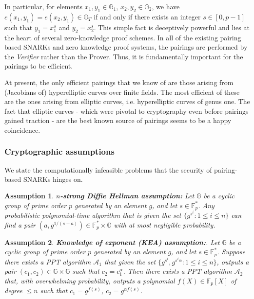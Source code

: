 \documentclass[11pt, lettersize, notitlepage, leqno, footskip=0.6cm]{article}
\newcommand{\bFp}{\mathbb{F}_p}
\newcommand{\mc}{\mathcal}
\newcommand{\mb}{\mathbb}
\newcommand{\al}{\alpha}
\newtheorem{Ass}{Assumption}[section]
\numberwithin{equation}{section}
\begin{document}
In particular, for elements $x_1,y_1\in \mb{G}_1$, $x_2,y_2\in \mb{G}_2$, we have $ e(x_1,y_1) = e(x_2,y_1)\in \mb{G}_T$ if and only if there exists an integer $s\in [0,p-1]$ such that $y_1 = x_1^s$ and $y_2 = x_2^s$. This simple fact is deceptively powerful and lies at the heart of several zero-knowledge proof schemes. In all of the existing pairing based SNARKs and zero knowledge proof systems, the pairings are performed by the \textit{Verifier} rather than the Prover. Thus, it is fundamentally important for the pairings to be efficient. 


At present, the only efficient pairings that we know of are those arising from (Jacobians of) hyperelliptic curves over finite fields. The most efficient of these are the ones arising from elliptic curves, i.e. hyperelliptic curves of genus one. The fact that elliptic curves - which were pivotal to cryptography even before pairings gained traction - are the best known source of pairings seems to be a happy coincidence.



\subsubsection{\fontsize{11}{11}\selectfont Cryptographic assumptions}



We state the computationally infeasible problems that the security of pairing-based SNARKs hinges on.

\begin{Ass} {\normalfont \textbf{{$n$-strong Diffie Hellman assumption:}}} Let $\mb{G}$ be a cyclic group of prime order $p$ generated by an element $g$, and let $s \in \bFp^*$. Any probabilistic polynomial-time algorithm that is given the set $\{g^{s^i}: 1\leq i\leq n \}$ can find a pair $(a, g^{1/(s+a)})\in \bFp^*\times \mb{G}$ with at most negligible probability.\end{Ass}

\begin{Ass} {\normalfont \textbf{{Knowledge of exponent (KEA) assumption:}}}. Let $\mb{G}$ be a cyclic group of prime order $p$ generated by an element $g$, and let $s \in \bFp^*$. Suppose there exists a PPT algorithm $\mc{A}_1$ that given the set $\{g^{s^i}, g^{s^i\al}: 1\leq i\leq n \}$, outputs a pair $(c_1, c_2)\in \mb{G}\times\mb{G}$ such that $c_2 = c_1^{\al}$. Then there exists a PPT algorithm $\mc{A}_2$ that, with overwhelming probability, outputs a polynomial $f(X)\in \bFp[X]$ of degree $\leq n$ such that $c_1 = g^{f(s)}$, $c_2 = g^{\al f(s)}$.\end{Ass}
\end{document}
